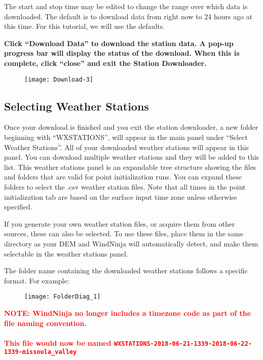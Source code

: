 \documentclass[12pt]{article}
\begin{document}
The start and stop time may be edited to change the range over which data is downloaded. The default is to download data from right now to 24 hours ago at this time.  For this tutorial, we will use the defaults.

\textbf{\color{red}Click “Download Data” to download the station data. A pop-up progress bar will display the status of the download. When this is complete, click “close” and exit the Station Downloader.}

\begin{figure}[H]
	\centering
	\label{}
	\texttt{[image: Download-3]}
\end{figure}

\subsection{Selecting Weather Stations}
Once your download is finished and you exit the station downloader, a new folder beginning with “WXSTATIONS”, will appear in the main panel under “Select Weather Stations”. All of your downloaded weather stations will appear in this panel. You can download multiple weather stations and they will be added to this list.  This weather stations panel is an expandable tree structure showing the files and folders that are valid for point initialization runs. You can expand these folders to select the .csv weather station files. Note that all times in the point initialization tab are based on the surface input time zone unless otherwise specified.

If you generate your own weather station files, or acquire them from other sources, these can also be selected. To use these files, place them in the same directory as your DEM and WindNinja will automatically detect, and make them selectable in the weather stations panel.

The folder name containing the downloaded weather stations follows a specific format. For example:

\begin{figure}[H]
	\centering
	\label{}
	\texttt{[image: FolderDiag\_1]}
\end{figure}

\begin{note}
\textcolor{red}{\textbf{NOTE: WindNinja no longer includes a timezone code as part of the file naming convention. \\ \\This file would now be named
\texttt{WXSTATIONS-2018-06-21-1339-2018-06-22-1339-missoula\_valley}}}
\end{note}
\end{document}
